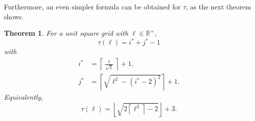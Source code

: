 \documentclass[12pt, a4paper]{article}
\newcommand{\funt}{\tau} %
\newcommand{\len}{\ell} %
\newcommand{\isoli}{i^\ast}
\newcommand{\jsoli}{j^\ast}
\newtheorem{theorem}{Theorem}%
\begin{document}
Furthermore, an even simpler formula can be obtained for $\funt$, as the next theorem shows.

\begin{theorem}
\label{theo: funt, sq, form}
For a unit square grid with $\len \in \mathbb R^+$,
\begin{equation}
\label{eq: theo: funt, sq, form; funt, with i, j}
\funt(\len) = \isoli+\jsoli-1
\end{equation}
with
\begin{align}
\label{eq: theo: funt, sq, form; i}
\isoli &= \left\lceil \frac{\len}{\sqrt{2}} \right\rceil + 1, \\
\label{eq: theo: funt, sq, form; j}
\jsoli &= \left\lceil \sqrt{\len^2-(\isoli-2)^2} \right\rceil + 1.
\end{align}
Equivalently,
\begin{equation}
\label{eq: theo: funt, sq, form; funt, simpler}
\funt(\len) = \left\lfloor \sqrt{2 \left\lceil \len^2 \right\rceil - 2} \right\rfloor + 3.
\end{equation}
\end{theorem}
\end{document}

